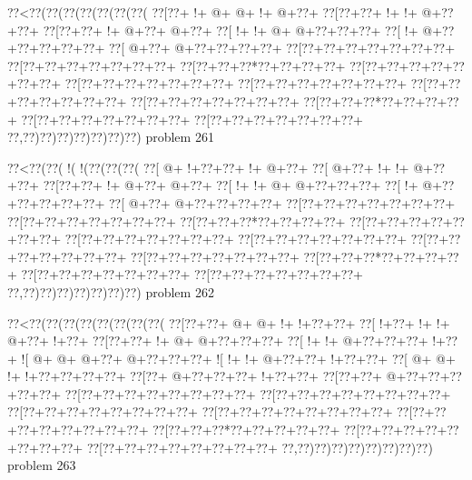 \vbox{\vbox{\goo
\0??<\0??(\0??(\0??(\0??(\0??(\0??(\0??(
\0??[\0??+\- !+\- @+\- @+\- !+\- @+\0??+
\0??[\0??+\0??+\- !+\- !+\- @+\0??+\0??+
\0??[\0??+\0??+\- !+\- @+\0??+\- @+\0??+
\0??[\- !+\- !+\- @+\- @+\0??+\0??+\0??+
\0??[\- !+\- @+\0??+\0??+\0??+\0??+\0??+
\0??[\- @+\0??+\- @+\0??+\0??+\0??+\0??+
\0??[\0??+\0??+\0??+\0??+\0??+\0??+\0??+
\0??[\0??+\0??+\0??+\0??+\0??+\0??+\0??+
\0??[\0??+\0??+\0??*\0??+\0??+\0??+\0??+
\0??[\0??+\0??+\0??+\0??+\0??+\0??+\0??+
\0??[\0??+\0??+\0??+\0??+\0??+\0??+\0??+
\0??[\0??+\0??+\0??+\0??+\0??+\0??+\0??+
\0??[\0??+\0??+\0??+\0??+\0??+\0??+\0??+
\0??[\0??+\0??+\0??+\0??+\0??+\0??+\0??+
\0??[\0??+\0??+\0??*\0??+\0??+\0??+\0??+
\0??[\0??+\0??+\0??+\0??+\0??+\0??+\0??+
\0??[\0??+\0??+\0??+\0??+\0??+\0??+\0??+
\0??,\0??)\0??)\0??)\0??)\0??)\0??)\0??)
}
\hfil problem 261\hfil\break
}

\vbox{\vbox{\goo
\0??<\0??(\0??(\- !(\- !(\0??(\0??(\0??(
\0??[\- @+\- !+\0??+\0??+\- !+\- @+\0??+
\0??[\- @+\0??+\- !+\- !+\- @+\0??+\0??+
\0??[\0??+\0??+\- !+\- @+\0??+\- @+\0??+
\0??[\- !+\- !+\- @+\- @+\0??+\0??+\0??+
\0??[\- !+\- @+\0??+\0??+\0??+\0??+\0??+
\0??[\- @+\0??+\- @+\0??+\0??+\0??+\0??+
\0??[\0??+\0??+\0??+\0??+\0??+\0??+\0??+
\0??[\0??+\0??+\0??+\0??+\0??+\0??+\0??+
\0??[\0??+\0??+\0??*\0??+\0??+\0??+\0??+
\0??[\0??+\0??+\0??+\0??+\0??+\0??+\0??+
\0??[\0??+\0??+\0??+\0??+\0??+\0??+\0??+
\0??[\0??+\0??+\0??+\0??+\0??+\0??+\0??+
\0??[\0??+\0??+\0??+\0??+\0??+\0??+\0??+
\0??[\0??+\0??+\0??+\0??+\0??+\0??+\0??+
\0??[\0??+\0??+\0??*\0??+\0??+\0??+\0??+
\0??[\0??+\0??+\0??+\0??+\0??+\0??+\0??+
\0??[\0??+\0??+\0??+\0??+\0??+\0??+\0??+
\0??,\0??)\0??)\0??)\0??)\0??)\0??)\0??)
}
\hfil problem 262\hfil\break
}

\vbox{\vbox{\goo
\0??<\0??(\0??(\0??(\0??(\0??(\0??(\0??(\0??(
\0??[\0??+\0??+\- @+\- @+\- !+\- !+\0??+\0??+
\0??[\- !+\0??+\- !+\- !+\- @+\0??+\- !+\0??+
\0??[\0??+\0??+\- !+\- @+\- @+\0??+\0??+\0??+
\0??[\- !+\- !+\- @+\0??+\0??+\0??+\- !+\0??+
\- ![\- @+\- @+\- @+\0??+\- @+\0??+\0??+\0??+
\- ![\- !+\- !+\- @+\0??+\0??+\- !+\0??+\0??+
\0??[\- @+\- @+\- !+\- !+\0??+\0??+\0??+\0??+
\0??[\0??+\- @+\0??+\0??+\0??+\- !+\0??+\0??+
\0??[\0??+\0??+\- @+\0??+\0??+\0??+\0??+\0??+
\0??[\0??+\0??+\0??+\0??+\0??+\0??+\0??+\0??+
\0??[\0??+\0??+\0??+\0??+\0??+\0??+\0??+\0??+
\0??[\0??+\0??+\0??+\0??+\0??+\0??+\0??+\0??+
\0??[\0??+\0??+\0??+\0??+\0??+\0??+\0??+\0??+
\0??[\0??+\0??+\0??+\0??+\0??+\0??+\0??+\0??+
\0??[\0??+\0??+\0??*\0??+\0??+\0??+\0??+\0??+
\0??[\0??+\0??+\0??+\0??+\0??+\0??+\0??+\0??+
\0??[\0??+\0??+\0??+\0??+\0??+\0??+\0??+\0??+
\0??,\0??)\0??)\0??)\0??)\0??)\0??)\0??)\0??)
}
\hfil problem 263\hfil\break
}

